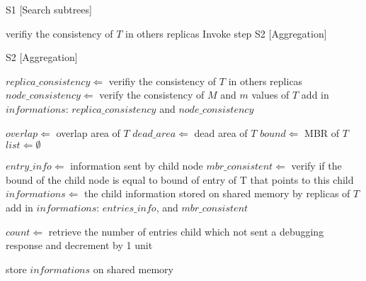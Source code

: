 \medskip
\begin{center}
\begin{minipage}{1\textwidth}
\begin{algorithm2e}[H]
\SetAlFnt{\small\sf}
 \DontPrintSemicolon
 \LinesNumbered
\SetAlgoLined
 \BlankLine
 \BlankLine
	
 S1 [Search subtrees]

{
  verifiy the consistency of $T$ in others replicas\;
	Invoke step S2 [Aggregation]\;
}

S2 [Aggregation]

$replica\_consistency \Leftarrow$ verifiy the consistency of $T$ in others replicas\;
$node\_consistency \Leftarrow$	verify the consistency of $M$ and $m$ values of  $T$\;
add in $informations$: $replica\_consistency$ and $node\_consistency$\;

$overlap \Leftarrow$ overlap area of $T$\;
$dead\_area \Leftarrow$ dead area of $T$\;
$bound \Leftarrow$ MBR of $T$\;
$list \Leftarrow \emptyset$\;


{
	  $entry\_info \Leftarrow$ information sent by child node\;
    $mbr\_consistent \Leftarrow$ verify if the bound of the child node is equal to bound of entry of T that points to this child\;
		$informations \Leftarrow$ the child information stored on shared memory by replicas of $T$\;
    add in $informations$: $entries\_info$, and $mbr\_consistent$\;
		
		$count \Leftarrow$ retrieve the number of entries child which not sent a debugging response and decrement by 1 unit\;
		
		{
			store $informations$ on shared memory\;
		}
            
}
\caption{$RDebug(T)$ 
\label {alg:rdebug}}
\end{algorithm2e}
\end{minipage}
\end{center}

